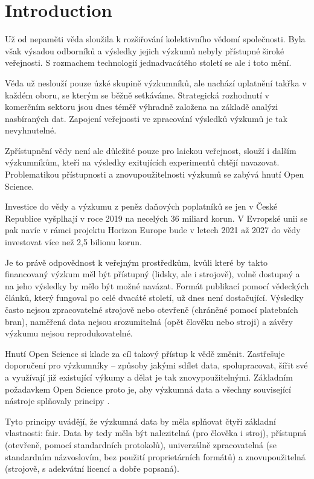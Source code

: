 \chapter{Introduction}

Už od nepaměti věda sloužila k rozšiřování kolektivního vědomí společnosti.
Byla však výsadou odborníků a výsledky jejich výzkumů nebyly přístupné široké veřejnosti.
S rozmachem technologií jednadvacátého století se ale i toto mění.

Věda už neslouží pouze úzké skupině výzkumníků, ale nachází uplatnění takřka v každém oboru, se kterým se běžně setkáváme.
Strategická rozhodnutí v komerčním sektoru jsou dnes téměř výhradně založena na základě analýzi nasbíraných dat.
Zapojení veřejnosti ve zpracování výsledků výzkumů je tak nevyhnutelné.

Zpřístupnění vědy není ale důležité pouze pro laickou veřejnost, slouží i dalším výzkumníkům, kteří na výsledky exitujících experimentů chtějí navazovat.
Problematikou přístupnosti a znovupoužitelnosti výzkumů se zabývá hnutí Open Science.

Investice do vědy a výzkumu z peněz daňových poplatníků se jen v České Republice vyšplhají v roce 2019 na necelých 36 miliard korun\cite{rvvi-budget}.
V Evropské unii se pak navíc v rámci projektu Horizon Europe bude v letech 2021 až 2027 do vědy investovat více než 2,5 bilionu korun\cite{euc-horizon-budget}.

Je to právě odpovědnost k veřejným prostředkům, kvůli které by takto financovaný výzkum měl být přístupný (lidsky, ale i strojově), volně dostupný a na jeho výsledky by mělo být možné navázat.
Formát publikací pomocí vědeckých článků, který fungoval po celé dvacáté století, už dnes není dostačující.
Výsledky často nejsou zpracovatelné strojově nebo otevřeně (chráněné pomocí platebních bran),
naměřená data nejsou srozumitelná (opět člověku nebo stroji) a závěry výzkumu nejsou reprodukovatelné.

Hnutí Open Science si klade za cíl takový přístup k vědě změnit.
Zastřešuje doporučení pro výzkumníky -- způsoby jakými sdílet data, spolupracovat, šířit své a využívají již existující výkumy a dělat je tak znovypoužitelnými.
Základním požadavkem Open Science proto je, aby výzkumná data a všechny související nástroje splňovaly principy .

Tyto principy uvádějí, že výzkumná data by měla splňovat čtyři základní vlastnosti: \gls{fair}.
Data by tedy měla být nalezitelná (pro člověka i stroj), přístupná (otevřeně, pomocí standardních protokolů), univerzálně zpracovatelná (se standardním názvoslovím, bez použití proprietárních formátů) a znovupoužitelná (strojově, s adekvátní licencí a dobře popsaná).

